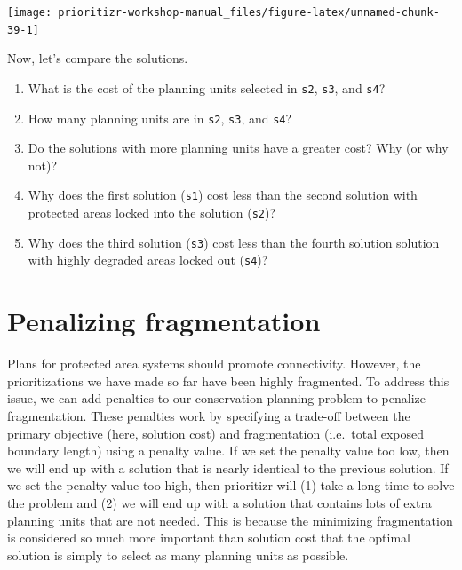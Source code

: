 \documentclass[
  12pt,
]{book}
\makeatletter
\providecommand{\tightlist}{%
  \setlength{\itemsep}{0pt}\setlength{\parskip}{0pt}}
\newenvironment{kframe}{%
\medskip{}
\setlength{\fboxsep}{.8em}
 \def\at@end@of@kframe{}%
 \ifinner\ifhmode%
  \def\at@end@of@kframe{\end{minipage}}%
  \begin{minipage}{\columnwidth}%
 \fi\fi%
 \def\FrameCommand##1{\hskip\@totalleftmargin \hskip-\fboxsep
 \colorbox{shadecolor}{##1}\hskip-\fboxsep
     \hskip-\linewidth \hskip-\@totalleftmargin \hskip\columnwidth}%
 \MakeFramed {\advance\hsize-\width
   \@totalleftmargin\z@ \linewidth\hsize
   \@setminipage}}%
 {\par\unskip\endMakeFramed%
 \at@end@of@kframe}
\newenvironment{rmdblock}[1]
  {
  \begin{itemize}
  \renewcommand{\labelitemi}{
    \raisebox{-.7\height}[0pt][0pt]{
      {\setkeys{Gin}{width=3em,keepaspectratio}\texttt{[image: images/\#1]}}
    }
  }
  \setlength{\fboxsep}{1em}
  \begin{kframe}
  \item
  }
  {
  \end{kframe}
  \end{itemize}
  }
\newenvironment{rmdquestion}
  {\begin{rmdblock}{question}}
  {\end{rmdblock}}
\makeatother
\begin{document}
\begin{center}\texttt{[image: prioritizr-workshop-manual\_files/figure-latex/unnamed-chunk-39-1]} \end{center}

\clearpage

Now, let's compare the solutions.

\begin{rmdquestion}
\begin{enumerate}
\def\labelenumi{\arabic{enumi}.}
\tightlist
\item
  What is the cost of the planning units selected in \texttt{s2}, \texttt{s3}, and \texttt{s4}?
\item
  How many planning units are in \texttt{s2}, \texttt{s3}, and \texttt{s4}?
\item
  Do the solutions with more planning units have a greater cost? Why (or why not)?
\item
  Why does the first solution (\texttt{s1}) cost less than the second solution with protected areas locked into the solution (\texttt{s2})?
\item
  Why does the third solution (\texttt{s3}) cost less than the fourth solution solution with highly degraded areas locked out (\texttt{s4})?
\end{enumerate}
\end{rmdquestion}

\hypertarget{penalizing-fragmentation}{%
\section{Penalizing fragmentation}\label{penalizing-fragmentation}}

Plans for protected area systems should promote connectivity. However, the prioritizations we have made so far have been highly fragmented. To address this issue, we can add penalties to our conservation planning problem to penalize fragmentation. These penalties work by specifying a trade-off between the primary objective (here, solution cost) and fragmentation (i.e.~total exposed boundary length) using a penalty value. If we set the penalty value too low, then we will end up with a solution that is nearly identical to the previous solution. If we set the penalty value too high, then prioritizr will (1) take a long time to solve the problem and (2) we will end up with a solution that contains lots of extra planning units that are not needed. This is because the minimizing fragmentation is considered so much more important than solution cost that the optimal solution is simply to select as many planning units as possible.
\end{document}
